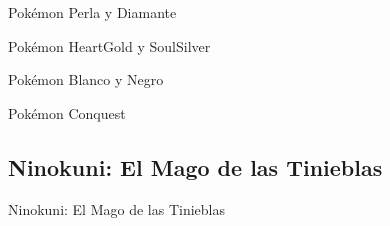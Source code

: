 \begin{frame}{Pokémon Perla y Diamante}

\end{frame}

\begin{frame}{Pokémon HeartGold y SoulSilver}

\end{frame}

\begin{frame}{Pokémon Blanco y Negro}

\end{frame}

\begin{frame}{Pokémon Conquest}

\end{frame}

\subsection{Ninokuni: El Mago de las Tinieblas}
\begin{frame}{Ninokuni: El Mago de las Tinieblas}

\end{frame}
